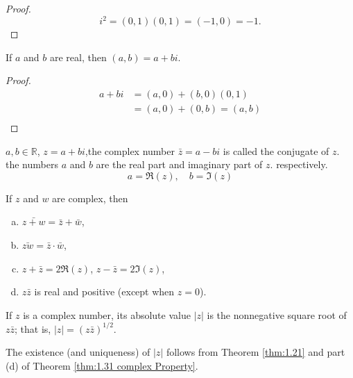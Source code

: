 \begin{proof}
    \begin{equation*}
        i^2=(0,1)(0,1)=(-1,0)=-1.
    \end{equation*}
\end{proof}

\begin{thm}\label{thm:1.29 complex number Transfer}
    If $a$ and $b$ are real, then $(a,b) =a + bi$.
\end{thm}

\begin{proof}
    \begin{align*}
        a+bi
        &=(a,0)+(b,0)(0,1)\\
        &=(a,0)+(0,b)=(a,b)\\
    \end{align*}
\end{proof}

\begin{myDef}\label{myDef:1.30 conjugate}
    $a,b\in \mathbb{R}$, $z=a+bi$,the complex number $\bar{z}=a-bi$ is called the conjugate of $z$. the numbers $a$ and $b$ are the real part and imaginary part of $z$. respectively.
    \begin{equation*}
        a=\Re(z), \quad
        b=\Im(z)
    \end{equation*}
\end{myDef}

\begin{thm}
    \label{thm:1.31 complex Property}
    If $z$ and $w$ are complex, then
    \begin{enumerate}[(a)]
        \item $\bar{z+w}=\bar{z}+\bar{w}$,
        \item $\bar{zw}=\bar{z}\cdot\bar{w}$,
        \item $z+\bar{z}=2\Re(z)$, $z-\bar{z}=2\Im(z)$,
        \item $z\bar{z}$ is real and positive (except when $z=0$).
    \end{enumerate}
\end{thm}


\begin{myDef}
    \label{myDef:1.32 complex_absolutevalue}
    If $z$ is a complex number, its absolute value $|z|$ is the nonnegative square root of $z\bar{z}$; that is, $|z| = (z\bar{z})^{1/2}$.
\end{myDef}
The existence (and uniqueness) of $|z|$ follows from Theorem \ref{thm:1.21} and
part (d) of Theorem \ref{thm:1.31 complex Property}.

